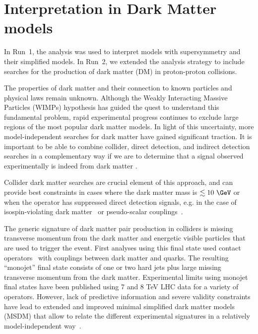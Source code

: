 \section{Interpretation in Dark Matter models}
\label{sec:darkmatter}

In Run~1, the \alphat analysis was used to interpret models with supersymmetry and their simplified models. In Run~2, we extended the analysis strategy to include searches for the production of dark matter (DM) in  proton-proton collisions.

The properties of dark matter and their connection to known particles and physical laws remain unknown. Although the Weakly Interacting Massive
Particles (WIMPs) hypothesis has guided the quest to understand this fundamental problem, rapid experimental progress continues to exclude
large regions of the most popular dark matter models. In light of this uncertainty, more model-independent searches for dark matter have gained
significant traction. It is important to be able to combine collider, direct detection, and indirect detection searches in a complementary way
if we are to determine that a signal observed experimentally is indeed from dark matter \cite{Bauer:2013ihz}.

Collider dark matter searches are crucial element of this approach, and can provide best constraints in cases where the dark matter mass is $\lesssim 10\ \GeV$ or when the operator 
has suppressed direct detection signals, e.g. in the case of isospin-violating dark matter~\cite{Feng:2011vu} or pseudo-scalar couplings~\cite{Buckley:2014fba}. 

The generic signature of dark matter pair production in colliders is missing transverse momentum from the  dark matter and energetic visible particles that are used to trigger the event. First analyses using this final state  used contact operators~\cite{Goodman:2010ku} with couplings between dark matter and quarks. The resulting ``monojet'' final state consists of one or two hard jets plus large missing transverse momentum from the dark matter. Experimental limits using monojet final states have been published using 7 and 8 TeV LHC data \cite{Chatrchyan:2012me,ATLAS:2012ky} for a variety of operators.
However, lack of predictive information and severe validity constraints have lead to extended and improved minimal simplified dark matter models (MSDM) that allow to relate the different experimental signatures in a relatively model-independent way~\cite{Buchmueller:2014yoa}. 

